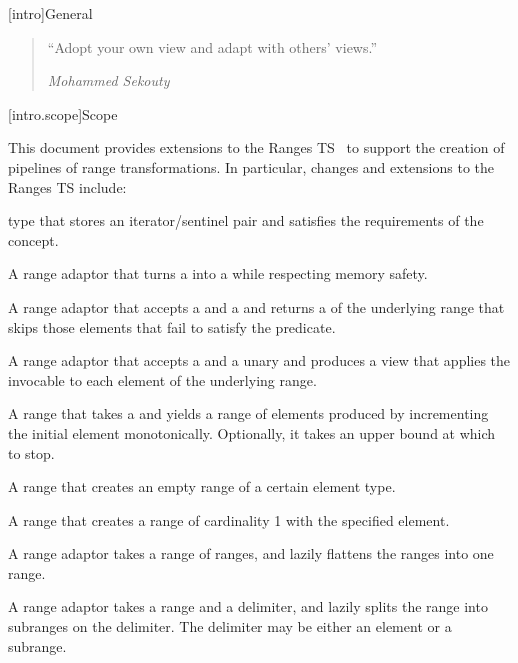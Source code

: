 [intro]{General}

\begin{quote}
``Adopt your own view and adapt with others' views.''
\begin{flushright}
\textemdash \textit{Mohammed Sekouty}
\end{flushright}
\end{quote}

[intro.scope]{Scope}


\pnum
This document provides extensions to the Ranges TS~\cite{ranges-ts} to
support the creation of pipelines of range transformations. In particular,
changes and extensions to the Ranges TS include:

\begin{itemize}
\item {} type that stores an
iterator/sentinel pair and satisfies the requirements of the  concept.
{\color{remclr}
\item {}}
\item A  range adaptor that turns a  into a
 while respecting memory safety.
\item A  range adaptor that accepts a  and a
 and returns a  of the underlying range that skips
those elements that fail to satisfy the predicate.
\item A  range adaptor that accepts a  and a
unary  and produces a view that applies the invocable to each
element of the underlying range.
\item A  range that takes a  and
yields a range of elements produced by incrementing the initial element
monotonically. Optionally, it takes an upper bound at which to stop.
\item A  range that creates an empty range of a certain
element type.
\item A  range that creates a range of cardinality 1 with
the specified element.
\item A  range adaptor takes a range of ranges,
and lazily flattens the ranges into one range.
\item A  range adaptor takes a range and a delimiter,
and lazily splits the range into subranges on the delimiter. The delimiter may
be either an element or a subrange.
\end{itemize}

